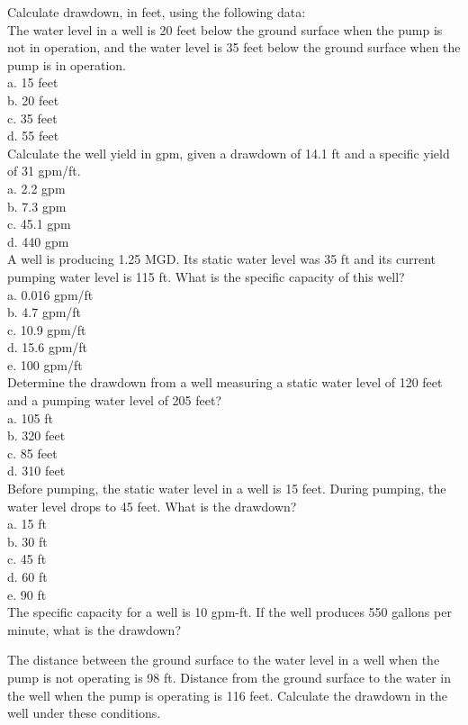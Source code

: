 Calculate drawdown, in feet, using the following data:\\
The water level in a well is 20 feet below the ground surface when the pump is not in operation, and the water level is 35 feet below the ground surface when the pump is in operation.\\
a.	15 feet\\
b.	20 feet\\
c.	35 feet\\
d.	55 feet\\

Calculate the well yield in gpm, given a drawdown of 14.1 ft and a specific yield of 31
gpm/ft.\\
a. 2.2 gpm\\
b. 7.3 gpm\\
c. 45.1 gpm \\
d. 440 gpm\\

A well is producing 1.25 MGD. Its static water level was 35 ft and its current pumping
water level is 115 ft. What is the specific capacity of this well? \\
a. 0.016 gpm/ft\\
b. 4.7 gpm/ft\\
c. 10.9 gpm/ft\\
d. 15.6 gpm/ft\\
e. 100 gpm/ft\\

Determine the drawdown from a well measuring a static water level of 120 feet and a pumping water level of 205 feet?\\
a. 105 ft\\
b. 320 feet\\
c. 85 feet\\
d. 310 feet\\

Before pumping, the static water level in a well is 15 feet. During pumping, the water
level drops to 45 feet. What is the drawdown?\\
a. 15 ft\\
b. 30 ft\\
c. 45 ft\\
d. 60 ft\\
e. 90 ft\\

The specific capacity for a well is 10 gpm-ft. If the well produces 550 gallons per minute, what is the drawdown?

The distance between the ground surface to the water level in a well when the pump is not operating is 98 ft.  Distance from the ground surface to the water in the well when the pump is operating is 116 feet. Calculate the drawdown in the well under these conditions.

